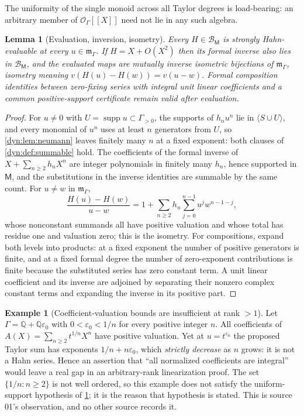 \documentclass[11pt,letterpaper]{article}
\newtheorem{lemma}[lemma]{Lemma}
\theoremstyle{definition}
\newtheorem{example}[example]{Example}
\theoremstyle{remark}
\newcommand{\Q}{\mathbb Q}
\newcommand{\OO}{\mathcal O}
\newcommand{\BB}{\mathscr B}
\newcommand{\m}{\mathfrak m}
\newcommand{\supp}{\operatorname{supp}}
\newcommand{\eps}{\varepsilon}
\numberwithin{equation}{section}
\begin{document}
The uniformity of the single monoid across all Taylor degrees is
load-bearing: an arbitrary member of $\OO_\Gamma[[X]]$ need not lie in any
such algebra.

\begin{lemma}[Evaluation, inversion, isometry]\label{dyn:lem:evaluation}
Every $H\in\BB_{\mathsf M}$ is strongly Hahn-evaluable at every
$u\in\m_\Gamma$. If $H=X+O(X^{2})$ then its formal inverse also lies in
$\BB_{\mathsf M}$, and the evaluated maps are mutually inverse isometric
bijections of $\m_\Gamma$, isometry meaning $v(H(u)-H(w))=v(u-w)$. Formal
composition identities between zero-fixing series with integral unit linear
coefficients and a common positive-support certificate remain valid after
evaluation.
\end{lemma}
\begin{proof}
For $u\ne0$ with $U=\supp u\subset\Gamma_{>0}$, the supports of $h_nu^{n}$
lie in $\langle S\cup U\rangle$, and every monomial of $u^{n}$ uses at
least $n$ generators from $U$, so \cref{dyn:lem:neumann} leaves finitely
many $n$ at a fixed exponent: both clauses of \cref{dyn:def:summable} hold.
The coefficients of the formal inverse of $X+\sum_{n\ge2}h_nX^{n}$ are
integer polynomials in finitely many $h_n$, hence supported in $\mathsf M$,
and the substitutions in the inverse identities are summable by the same
count. For $u\ne w$ in $\m_\Gamma$,
\[
 \frac{H(u)-H(w)}{u-w}=1+\sum_{n\ge2}h_n\sum_{j=0}^{n-1}u^{j}w^{n-1-j},
\]
whose nonconstant summands all have positive valuation and whose total has
residue one and valuation zero; this is the isometry. For compositions,
expand both levels into products: at a fixed exponent the number of
positive generators is finite, and at a fixed formal degree the number of
zero-exponent contributions is finite because the substituted series has
zero constant term. A unit linear coefficient and its inverse are adjoined
by separating their nonzero complex constant terms and expanding the
inverse in its positive part.
\end{proof}

\begin{example}[Coefficient-valuation bounds are insufficient at rank $>1$]
\label{dyn:ex:bad-support}
Let $\Gamma=\Q+\Q\eps_0$ with $0<\eps_0<1/n$ for every positive integer
$n$. All coefficients of $A(X)=\sum_{n\ge2}t^{1/n}X^{n}$ have positive
valuation. Yet at $u=t^{\eps_0}$ the proposed Taylor sum has exponents
$1/n+n\eps_0$, which \emph{strictly decrease} as $n$ grows: it is not a
Hahn series. Hence an assertion that ``all normalized coefficients are
integral'' would leave a real gap in an arbitrary-rank linearization proof.
The set $\{1/n:n\ge2\}$ is not well ordered, so this example does not
satisfy the uniform-support hypothesis of \cref{dyn:lem:evaluation}; it is
the reason that hypothesis is stated. This is source 01's observation, and
no other source records it.
\end{example}
\end{document}
